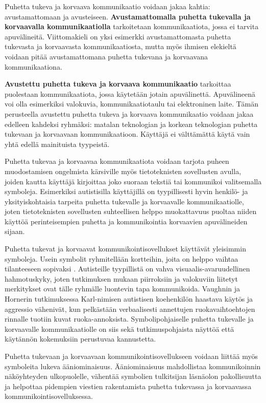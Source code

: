 \documentclass[utf8]{gradu3}
\begin{document}
Puhetta tukeva ja korvaava kommunikaatio voidaan jakaa kahtia: avustamattomaan ja avusteiseen. \textbf{Avustamattomalla puhetta tukevalla ja korvaavalla kommunikaatiolla} tarkoitetaan kommunikaatiota, jossa ei tarvita apuvälineitä. Viittomakieli on yksi esimerkki avustamattomasta puhetta tukevasta ja korvaavasta kommunikaatiosta, mutta myös ihmisen elekieltä voidaan pitää avustamattomana puhetta tukevana ja korvaavana kommunikaationa. 

\textbf{Avustettu puhetta tukeva ja korvaava kommunikaatio} tarkoittaa puolestaan kommunikaatiota, jossa käytetään jotain apuvälinettä. Apuvälineenä voi olla esimerkiksi valokuvia, kommunikaatiotaulu tai elektroninen laite. Tämän perusteella avustettu puhetta tukeva ja korvaava kommunikaatio voidaan jakaa edelleen kahdeksi ryhmäksi: matalan teknologian ja korkean teknologian puhetta tukevaan ja korvaavaan kommunikaatioon. Käyttäjä ei välttämättä käytä vain yhtä edellä mainituista tyypeistä. \parencite[]{AAC-conditional-use}

Puhetta tukevaa ja korvaavaa kommunikaatiota voidaan tarjota puheen muodostamisen ongelmista kärsiville myös tietoteknisten sovellusten avulla, joiden kautta käyttäjä kirjoittaa joko suoraan tekstiä tai kommunikoi valitsemalla symboleja. Esimerkiksi autistisilla käyttäjillä on tyypillisesti hyvin henkilö- ja yksityiskohtaisia tarpeita puhetta tukevalle ja korvaavalle kommunikaatiolle, joten tietoteknisten sovellusten suhteellisen helppo muokattavuus puoltaa niiden käyttöä perinteisempien puhetta ja kommunikointia korvaavien apuvälineiden sijaan.

\label{AAC-symbols}
Puhetta tukevat ja korvaavat kommunikointisovellukset käyttävät yleisimmin symboleja. Usein symbolit ryhmitellään kortteihin, joita on helppo vaihtaa tilanteeseen sopivaksi \label{AAC-cards}. Autisteille tyypillistä on vahva visuaalis-avaruudellinen hahmotuskyky, joten tutkimuksen mukaan piirroksiin ja valokuviin liitetyt merkitykset ovat tälle ryhmälle luontevin tapa kommunikoida. Vaughnin ja Hornerin tutkimuksessa \parencite[]{concrete-versus-verbal} Karl-nimisen autistisen koehenkilön haastava käytös ja aggressio vähenivät, kun pelkästään verbaalisesti annettujen ruokavaihtoehtojen rinnalle tuotiin kuvat ruoka-annoksista. Symbolipohjaiselle puhetta tukevalle ja korvaavalle kommunikaatiolle on siis sekä tutkimuspohjaista näyttöä että käytännön kokemuksiin perustuvaa kannustetta.

Puhetta tukevaan ja korvaavaan kommunikointisovellukseen voidaan liittää myös symboleita lukeva ääniominaisuus. Ääniominaisuus mahdollistaa kommunikoinnin näköyhteyden ulkopuolelle, vähentää symbolien tulkitsijan läsnäolon pakollisuutta ja helpottaa pidempien viestien rakentamista puhetta tukevassa ja korvaavassa kommunikointisovelluksessa. \parencite[]{AAC-interventions}
\end{document}
